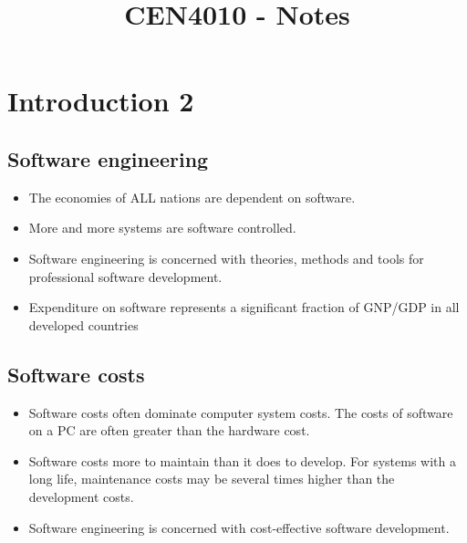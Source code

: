 \documentclass{article}
\title{\textbf{CEN4010 - Notes}}
\author{}
\date{}
\begin{document}
\maketitle
\tableofcontents
\newpage

\chapter{Introduction 2}
\section{Software engineering}
\vspace{-8pt}
\begin{itemize}
  \setlength\itemsep{-.25em}
  \item The economies of ALL nations are dependent on software.
  \item More and more systems are software controlled.
  \item Software engineering is concerned with theories, methods and tools for professional software development.
  \item Expenditure on software represents a significant fraction of GNP/GDP in all developed countries
\end{itemize}

\section{Software costs}
\vspace{-8pt}
\begin{itemize}
  \setlength\itemsep{-.25em}
  \item Software costs often dominate computer system costs. The costs of software on a PC are often greater than the hardware cost.
  \item Software costs more to maintain than it does to develop. For systems with a long life, maintenance costs may be several times higher than the development costs.
  \item Software engineering is concerned with cost-effective software development.
\end{itemize}
\end{document}
